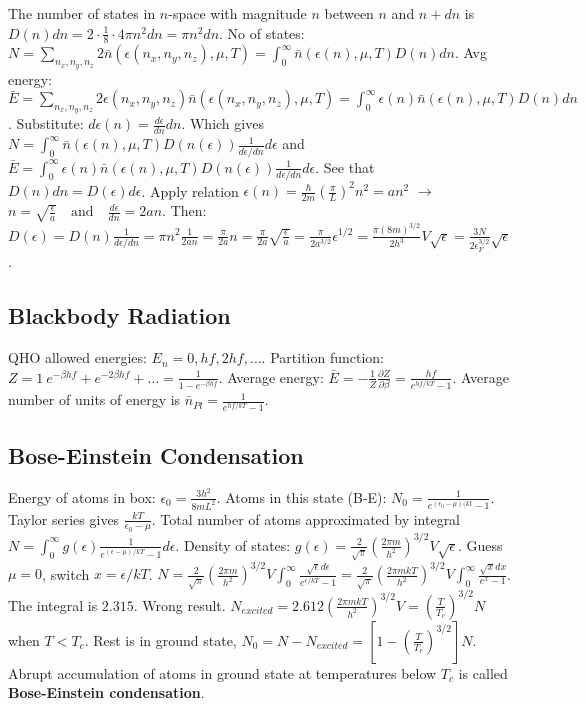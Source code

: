 \documentclass[11pt,twocolumn]{amsart}
\begin{document}
The number of states in $n$-space with magnitude $n$ between $n$ and $n+dn$ is $ D(n)dn = 2 \cdot \frac{1}{8} \cdot 4 \pi n^2 dn = \pi n^2 dn $. No of states: $ N = \sum_{n_x,n_y,n_z} 2\bar{n}(\epsilon(n_x,n_y,n_z), \mu, T) = \int_0^{\infty} \bar{n}(\epsilon(n), \mu, T)D(n)dn $. Avg energy: $ \bar{E} = \sum_{n_x,n_y,n_z} 2\epsilon(n_x,n_y,n_z)\bar{n}(\epsilon(n_x,n_y,n_z), \mu, T) = \int_0^{\infty}\epsilon(n)\bar{n}(\epsilon(n), \mu, T)D(n)dn $. Substitute: $ d\epsilon(n) = \frac{d\epsilon}{dn}dn $. Which gives $ N = \int_0^{\infty} \bar{n}(\epsilon(n), \mu, T)D(n(\epsilon))\frac{1}{d\epsilon / dn} d\epsilon $ and \\$ \bar{E} = \int_0^{\infty}\epsilon(n)\bar{n}(\epsilon(n), \mu, T)D(n(\epsilon))\frac{1}{d\epsilon / dn} d\epsilon$. See that $ D(n)dn = D(\epsilon)d\epsilon $. Apply relation $ \epsilon(n) = \frac{\hbar}{2m}\left( \frac{\pi}{L} \right)^2 n^2 = an^2 $ $\rightarrow$ $ n = \sqrt{\frac{\epsilon}{a}} \quad \text{and} \quad \frac{d\epsilon}{dn} = 2an $. Then: $ D(\epsilon) = D(n)\frac{1}{d\epsilon / dn} = \pi n^2 \frac{1}{2an} = \frac{\pi}{2a}n = \frac{\pi}{2a} \sqrt{\frac{\epsilon}{a}}
        = \frac{\pi}{2a^{3/2}}\epsilon^{1/2} = \frac{\pi(8m)^{3/2}}{2h^3}V\sqrt{\epsilon} = \frac{3N}{2\epsilon_F^{3/2}}\sqrt{\epsilon} $.

\subsection{Blackbody Radiation}
QHO allowed energies: $E_n = 0, hf, 2hf, \dots$. Partition function: $Z = 1 \ e^{-\beta hf} + e^{-2\beta hf} + \dots = \frac{1}{1-e^{-\beta hf}}$. Average energy: $\bar{E} = -\frac{1}{Z}\frac{\partial Z}{\partial \beta} = \frac{hf}{e^{hf/kT}-1}$. Average number of units of energy is $\bar{n}_{Pl} = \frac{1}{e^{hf/kT}-1}$.

\subsection{Bose-Einstein Condensation}
Energy of atoms in box: $\epsilon_0 = \frac{3h^2}{8mL^2}$. Atoms in this state (B-E): $N_0 = \frac{1}{e^{(\epsilon_0-\mu)(kt} - 1}$. Taylor series gives $ \frac{kT}{\epsilon_0 - \mu}$. Total number of atoms approximated by integral $N = \int_0^{\infty} g(\epsilon) \frac{1}{e^{(\epsilon - \mu)/kT} - 1} d\epsilon$. Density of states: $g(\epsilon) = \frac{2}{\sqrt{\pi}}\left( \frac{2\pi m}{h^2} \right)^{3/2} V\sqrt{\epsilon}$. Guess $\mu = 0$, switch $x= \epsilon/kT$. $N = \frac{2}{\sqrt{\pi}}\left( \frac{2\pi m}{h^2} \right)^{3/2} V \int_0^\infty \frac{\sqrt{\epsilon}d\epsilon}{e^{\epsilon/kT}-1} = \frac{2}{\sqrt{\pi}}\left( \frac{2\pi m kT}{h^2} \right)^{3/2} V \int_0^\infty \frac{\sqrt{x}dx}{e^x - 1}$. The integral is $2.315$. Wrong result. $N_{excited} = 2.612 \left(\frac{2\pi m kT}{h^2} \right)^{3/2} V = \left(\frac{T}{T_c} \right)^{3/2}N$ when $T < T_c$. Rest is in ground state, $N_0 = N-N_{excited} = \left[1- \left(\frac{T}{T_c} \right)^{3/2} \right]N$. Abrupt accumulation of atoms in ground state at temperatures below $T_c$ is called \textbf{Bose-Einstein condensation}.
\end{document}
